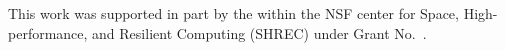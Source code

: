 \begin{acks}                            
	This work was supported in part by the  within the NSF center for Space, High-performance, and Resilient Computing (SHREC) under Grant No.~.
\end{acks}